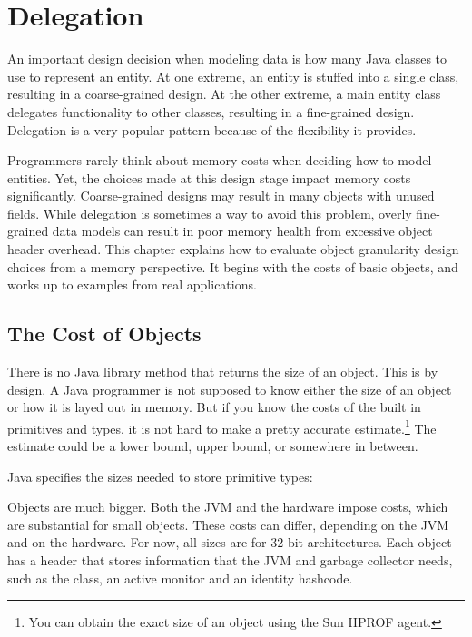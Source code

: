 \documentclass{book}
\theoremstyle{definition}
\begin{document}
\chapter{Delegation}

An important design decision when modeling data is how many Java classes to use to represent an entity. At one extreme, an entity is stuffed into a single class, resulting in a coarse-grained design. At the other extreme, a main entity class delegates functionality to other classes, resulting in a fine-grained design.  Delegation is a very popular pattern because of the flexibility it provides. 

Programmers rarely think about memory costs when deciding how to model entities. Yet, the choices made at this design stage impact memory costs significantly. Coarse-grained designs may result in many objects with unused fields. While delegation is sometimes a way to avoid this problem, overly fine-grained data models can result in poor memory health from excessive object header overhead. This chapter explains how to evaluate object granularity design choices from a memory perspective. It begins with the costs of basic objects, and works up to examples from real applications.
  
\section{The Cost of Objects}


There is no Java library method that returns the size of an object. This is by design. A Java programmer is not supposed to know either the size of an object or how it is layed out in memory. But if you know the costs of the built in primitives and types, it is not hard to make a pretty accurate estimate.\footnote{You can obtain the exact size of an object using the Sun HPROF agent.} The estimate could be a lower bound, upper bound, or somewhere in between.   

Java specifies the sizes needed to store primitive types:

Objects are much bigger. Both the JVM and the hardware impose costs, which are substantial for small objects. These costs can differ, depending on the JVM and on the hardware. For now, all sizes are for 32-bit architectures. Each object has a header that stores information that the JVM and garbage collector needs, such as the class, an active monitor and an identity hashcode. 
\end{document}
